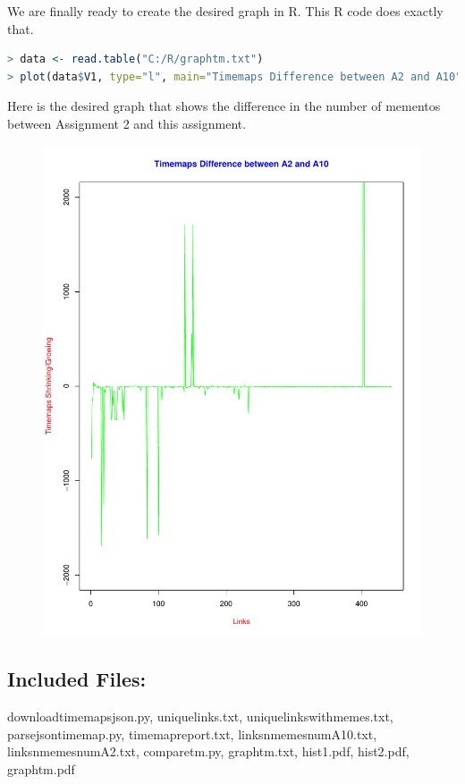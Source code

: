 \documentclass[a4paper, 11pt]{article}
\begin{document}
We are finally ready to create the desired graph in R. This R code does exactly that.

\begin{lstlisting}[language=R, breakatwhitespace=〈false), label=Command, caption=R code to create the graph]
> data <- read.table("C:/R/graphtm.txt")
> plot(data$V1, type="l", main="Timemaps Difference between A2 and A10", col.main="blue", col="green", xlab ="Links",ylab="Timemaps Shrinking/Growing", col.lab="red", ylim=c(-2000,2000))
\end{lstlisting}
Here is the desired graph that shows the difference in the number of mementos between Assignment 2 and this assignment.

\begin{figure}[H]
\centering
\includegraphics[scale=0.5]{graphtm.pdf}
\end{figure}

\subsection*{Included Files:}
downloadtimemapsjson.py, uniquelinks.txt, uniquelinkswithmemes.txt, parsejsontimemap.py, timemapreport.txt, linksnmemesnumA10.txt, linksnmemesnumA2.txt, comparetm.py, graphtm.txt, hist1.pdf, hist2.pdf, graphtm.pdf 
\end{document}
